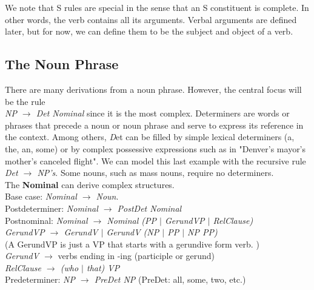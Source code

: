 \documentclass[11pt]{article}
\begin{document}
				We note that S rules are special in the sense that an S constituent is complete. In other words, 
				the verb contains all its arguments. Verbal arguments are defined later, but for now, we can 
				define them to be the subject and object of a verb. 
			
			\subsection*{The Noun Phrase}
				There are many derivations from a noun phrase. However, the central focus will be the rule \\
				\textit{NP $\rightarrow$ Det Nominal} since it is the most complex. Determiners are words or phrases 
				that precede a noun or noun phrase and serve to express its reference in the context. Among others,
				\textit Det can be filled by simple lexical determiners (a, the, an, some) or by complex possessive 
				expressions such as in  "Denver's mayor's mother's canceled flight". We can model this last example with 
				the recursive rule \textit{Det $\rightarrow$ NP's}. Some nouns, such as mass nouns, require no 
				determiners. \\
				
				\noindent The \textbf{Nominal} can derive complex structures. \\
				Base case: \textit{Nominal $\rightarrow$ Noun}. \\
				Postdeterminer:  \textit{Nominal $\rightarrow$ PostDet Nominal} \\
				Postnominal: \textit{ Nominal $\rightarrow$ Nominal (PP $|$ GerundVP $|$ RelClause)} \\
				 \indent \indent \indent \indent 
				 	\textit{GerundVP $\rightarrow$ GerundV $|$ GerundV (NP $|$ PP $|$ NP PP)} \\
				\indent \indent \indent \indent
					(A GerundVP is just a VP that starts with a gerundive form verb. ) \\
				 \indent \indent \indent \indent 
				 	\textit{GerundV $\rightarrow$} verbs ending in -ing (participle or gerund)	\\
				\indent \indent \indent \indent
					\textit{RelClause $\rightarrow$ (who $|$ that) VP} \\
				Predeterminer: \textit{NP $\rightarrow$ PreDet NP} (PreDet: all, some, two, etc.)
\end{document}

